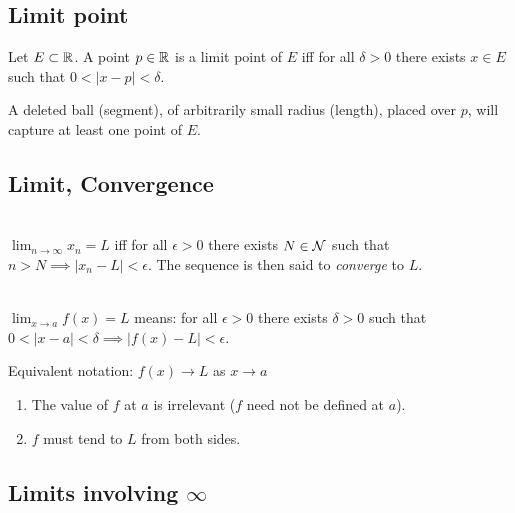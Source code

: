 \subsection{Limit point}
\begin{definition*}
Let $E \subset \mathbb{R}$. A point $p \in \mathbb{R}$ is a limit point of $E$ iff for all $\delta > 0$ there
exists $x \in E$ such that $0 < |x - p| < \delta$.
\end{definition*}
\begin{intuition*}
  A deleted ball (segment), of arbitrarily small radius (length), placed over $p$, will capture at
  least one point of $E$.
\end{intuition*}

\subsection{Limit, Convergence}

\begin{definition*}~\\
  $\lim_{n \to \infty} x_n = L$ iff for all $\epsilon > 0$ there exists $N \in \mathcal{N}$ such that
  $n > N \implies |x_n - L| < \epsilon$. The sequence is then said to \textit{converge} to $L$.
\end{definition*}

\begin{definition*}~\\
  $\lim_{x \to a} f(x) = L$ means: for all $\epsilon > 0$ there exists $\delta > 0$ such that
  $0 < |x - a| < \delta \implies |f(x) - L| < \epsilon$.
\end{definition*}

Equivalent notation: $f(x) \to L$ as $x \to a$

\begin{remark*}\hspace{0pt}
  \begin{enumerate}
  \item The value of $f$ at $a$ is irrelevant ($f$ need not be defined at $a$).
  \item $f$ must tend to $L$ from both sides.
  \end{enumerate}
\end{remark*}

\subsection{Limits involving $\infty$}

